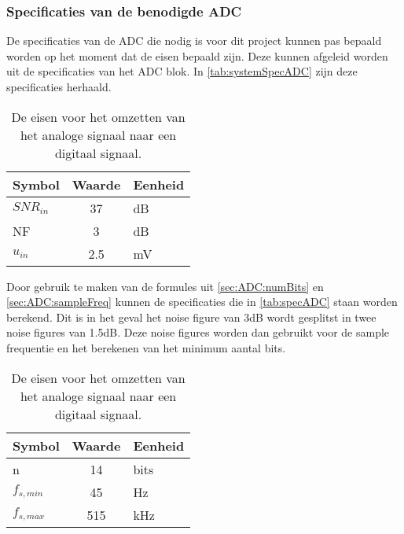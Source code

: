 \subsubsection{Specificaties van de benodigde ADC}
De specificaties van de ADC die nodig is voor dit project kunnen pas bepaald worden op het moment dat de eisen bepaald zijn. Deze kunnen afgeleid worden uit de specificaties van het ADC blok. In \autoref{tab:systemSpecADC} zijn deze specificaties herhaald.
\begin{table}[ht]
    \centering
    \begin{tabular}{l|c|l}
        Symbol      & Waarde & Eenheid\\\hline
        $SNR_{in}$  & 37        & dB\\
        NF          & 3         & dB\\
        $u_{in}$    & 2.5       & mV\\
    \end{tabular}
    \caption{De eisen voor het omzetten van het analoge signaal naar een digitaal signaal.}
    \label{tab:systemSpecADC}
\end{table}
Door gebruik te maken van de formules uit \cref{sec:ADC:numBits} en \autoref{sec:ADC:sampleFreq} kunnen de specificaties die in \autoref{tab:specADC} staan worden berekend. Dit is in het geval het noise figure van 3dB wordt gesplitst in twee noise figures van 1.5dB. Deze noise figures worden dan gebruikt voor de sample frequentie en het berekenen van het minimum aantal bits.
\begin{table}[ht]
    \centering
    \begin{tabular}{l|c|l}
        Symbol      & Waarde    & Eenheid\\\hline
        n           & 14        & bits\\
        $f_{s,min}$ & 45        & Hz\\
        $f_{s,max}$ & 515       & kHz\\
    \end{tabular}
    \caption{De eisen voor het omzetten van het analoge signaal naar een digitaal signaal.}
    \label{tab:specADC}
\end{table}
